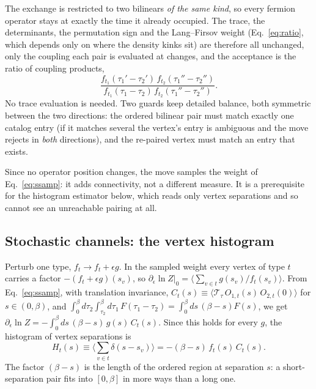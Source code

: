 \documentclass[a4paper,12pt]{article}
\newcommand{\aver}[1]{\ensuremath{\langle#1\rangle}}
\renewcommand{\t}{\ensuremath{\tau}}
\newcommand{\TT}{\ensuremath{\mathcal{T}_\t}}
\begin{document}
The exchange is restricted to two bilinears \emph{of the same kind}, so every fermion
operator stays at exactly the time it already occupied. The trace, the determinants, the
permutation sign and the Lang--Firsov weight (Eq.~\eqref{eq:ratio}, which depends only on
where the density kinks sit) are therefore all unchanged, only the coupling each pair is
evaluated at changes, and the acceptance is the ratio of coupling products,
\begin{equation}
  \frac{f_{t_1}(\t_1'-\t_2')\,f_{t_2}(\t_1''-\t_2'')}{f_{t_1}(\t_1-\t_2)\,f_{t_2}(\t_1''-\t_2'')} .
\end{equation}
No trace evaluation is needed. Two guards keep detailed balance, both symmetric between
the two directions: the ordered bilinear pair must match exactly one catalog entry (if it
matches several the vertex's entry is ambiguous and the move rejects in \emph{both}
directions), and the re-paired vertex must match an entry that exists.

Since no operator position changes, the move samples the weight of
Eq.~\eqref{eq:ssamp}: it adds connectivity, not a different measure. It is a prerequisite
for the histogram estimator below, which reads only vertex separations and so cannot see
an unreachable pairing at all.

\subsection{Stochastic channels: the vertex histogram}
\label{sec:histogram}

Perturb one type, $f_t\to f_t+\epsilon g$. In the sampled weight every vertex of type
$t$ carries a factor $-(f_t+\epsilon g)(s_v)$, so
$\partial_\epsilon\ln Z|_{0}=\aver{\sum_{v\in t}g(s_v)/f_t(s_v)}$. From
Eq.~\eqref{eq:ssamp}, with translation invariance,
$C_t(s)\equiv\aver{\TT\,O_{1,t}(s)\,O_{2,t}(0)}$ for $s\in(0,\beta)$, and
$\int_0^\beta d\t_2\int_{\t_2}^\beta d\t_1\,F(\t_1-\t_2)=\int_0^\beta ds\,(\beta-s)F(s)$,
we get $\partial_\epsilon\ln Z=-\int_0^\beta ds\,(\beta-s)\,g(s)\,C_t(s)$. Since this
holds for every $g$, the histogram of vertex separations is
\begin{equation}
  H_t(s)\equiv\aver{\sum_{v\in t}\delta(s-s_v)}=-(\beta-s)\,f_t(s)\,C_t(s).
  \label{eq:hist}
\end{equation}
The factor $(\beta-s)$ is the length of the ordered region at separation $s$: a
short-separation pair fits into $[0,\beta]$ in more ways than a long one.
\end{document}
